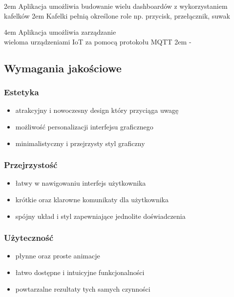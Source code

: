 {2em}{
    Aplikacja umożliwia budowanie wielu dashboardów z wykorzystaniem kafelków
}
{2em}{
    Kafelki pełnią określone role np. przycisk, przełącznik, suwak
}

{4em}{
    Aplikacja umożliwia zarządzanie\\
    wieloma urządzeniami IoT za pomocą protokołu MQTT
}
{2em}{
    -
}

\subsection{Wymagania jakościowe}

\subsubsection{Estetyka}

\begin{itemize}[leftmargin=*]
    \item atrakcyjny i nowoczesny design który przyciąga uwagę
    \item możliwość personalizacji interfejsu graficznego
    \item minimalistyczny i przejrzysty styl graficzny
\end{itemize}

\subsubsection{Przejrzystość}

\begin{itemize}[leftmargin=*]
    \item łatwy w nawigowaniu interfejs użytkownika
    \item krótkie oraz klarowne komunikaty dla użytkownika
    \item spójny układ i styl zapewniające jednolite doświadczenia
\end{itemize}

\subsubsection{Użyteczność}

\begin{itemize}[leftmargin=*]
    \item płynne oraz proste animacje
    \item łatwo dostępne i intuicyjne funkcjonalności
    \item powtarzalne rezultaty tych samych czynności
\end{itemize}

